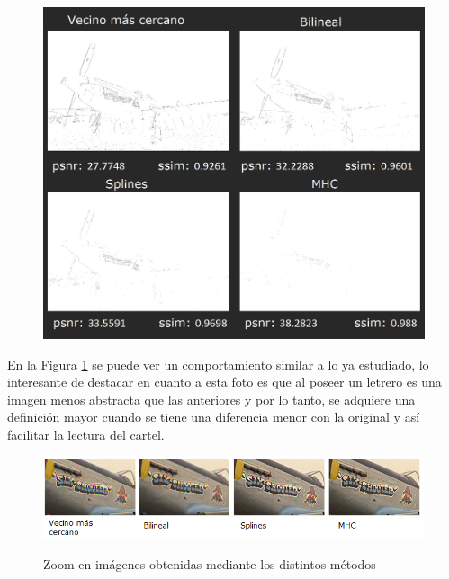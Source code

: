 \documentclass[a4paper]{article}
\begin{document}
\begin{figure}[h!]
    \caption{}
    \begin{center}
    \includegraphics[scale=0.40]{imagenes/comparacion/09/collage}
    \label{imagen9}
  \end{center}
\end{figure}

\newpage

En la Figura \ref{imagen9} se puede ver un comportamiento similar a lo ya estudiado, lo interesante de destacar en cuanto a esta foto es que al poseer un letrero es una imagen menos abstracta que las anteriores y por lo tanto, se adquiere una definici\'on mayor cuando se tiene una diferencia menor con la original y as\'i facilitar la lectura del cartel.



\begin{figure}[h!]
    \caption{Zoom en imágenes obtenidas mediante los distintos métodos}
    \begin{center}
    \includegraphics[scale=0.9]{imagenes/comparacion/09/cartel}
    \label{cartel}
  \end{center}
\end{figure}
\end{document}
